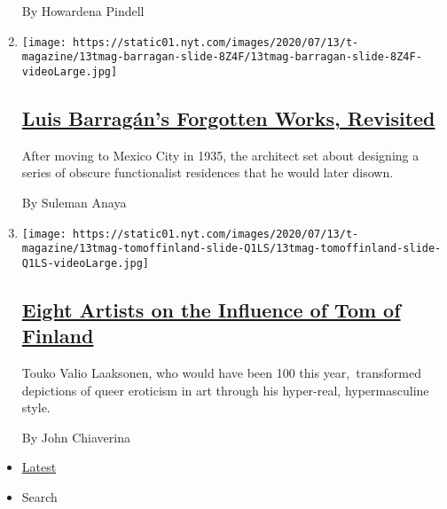 \begin{enumerate}
  By Howardena Pindell
\item
  \texttt{[image: https://static01.nyt.com/images/2020/07/13/t-magazine/13tmag-barragan-slide-8Z4F/13tmag-barragan-slide-8Z4F-videoLarge.jpg]}

  \hypertarget{luis-barraguxe1ns-forgotten-works-revisited-1}{%
  \subsection{\texorpdfstring{\href{/2020/07/24/t-magazine/luis-barragan.html}{Luis
  Barragán's Forgotten Works,
  Revisited}}{Luis Barragán's Forgotten Works, Revisited}}\label{luis-barraguxe1ns-forgotten-works-revisited-1}}

  After moving to Mexico City in 1935, the architect set about designing
  a series of obscure functionalist residences that he would later
  disown.

  By Suleman Anaya
\item
  \texttt{[image: https://static01.nyt.com/images/2020/07/13/t-magazine/13tmag-tomoffinland-slide-Q1LS/13tmag-tomoffinland-slide-Q1LS-videoLarge.jpg]}

  \hypertarget{eight-artists-on-the-influence-of-tom-of-finland}{%
  \subsection{\texorpdfstring{\href{/2020/07/23/t-magazine/tom-of-finland.html}{Eight
  Artists on the Influence of Tom of
  Finland}}{Eight Artists on the Influence of Tom of Finland}}\label{eight-artists-on-the-influence-of-tom-of-finland}}

  Touko Valio Laaksonen, who would have been 100 this year,~transformed
  depictions of queer eroticism in art through his hyper-real,
  hypermasculine style.

  By John Chiaverina
\end{enumerate}

\begin{itemize}
\tightlist
\item
  \protect\hyperlink{stream-panel}{Latest}
\item
  Search
\end{itemize}

